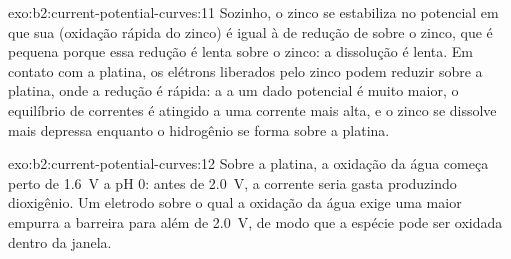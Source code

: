 \begin{solution}{exo:b2:current-potential-curves:11}
Sozinho, o zinco se estabiliza no potencial em que sua 
(oxidação rápida do zinco) é igual à  de redução de 
sobre o zinco, que é pequena porque essa redução é lenta sobre o zinco: a
dissolução é lenta. Em contato com a platina, os elétrons liberados pelo zinco
podem reduzir  sobre a platina, onde a redução é rápida: a  a um dado potencial é muito maior, o equilíbrio de correntes é
atingido a uma corrente mais alta, e o zinco se dissolve mais depressa
enquanto o hidrogênio se forma sobre a platina.
\end{solution}

\begin{solution}{exo:b2:current-potential-curves:12}
Sobre a platina, a oxidação da água começa perto de \qty{1.6}{V} a pH 0: antes
de \qty{2.0}{V}, a corrente seria gasta produzindo dioxigênio. Um eletrodo sobre
o qual a oxidação da água exige uma  maior empurra a barreira para
além de \qty{2.0}{V}, de modo que a espécie pode ser oxidada dentro da janela.
\end{solution}

